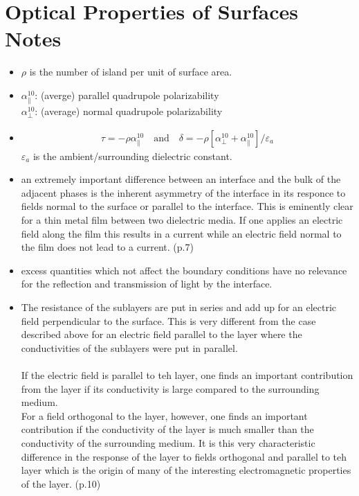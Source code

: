 \section{\textbf{Optical Properties of Surfaces Notes}}
\begin{itemize}
\item $\rho$ is the number of island per unit of surface area.
\item $\alpha_{\parallel}^{10}$: (averge) parallel quadrupole polarizability \\
   $\alpha_{\perp}^{10}$: (average) normal quadrupole polarizability
   \item 
   \begin{align}
      \tau = -\rho \alpha_{\parallel}^{10} \:\:\:\text{ and }\:\:\: \delta = -\rho [\alpha_{\perp}^{10} + \alpha_{\parallel}^{10} ]/\varepsilon_a
   \end{align}
   $\varepsilon_a$ is the ambient/surrounding dielectric constant.

   \item an extremely important difference between an interface and the bulk of the adjacent phases is the
   inherent asymmetry of the interface in its responce to fields normal to the surface or parallel
   to the interface. This is eminently clear for a thin metal film between two dielectric media.
   If one applies an electric field along the film this results in a current while 
   an electric field normal to the film does not lead to a current. (p.7)

   \item excess quantities which not affect the boundary conditions have no relevance for the reflection
   and transmission of light by the interface.

   \item The resistance of the sublayers are put in series and add up for an electric field perpendicular
   to the surface. This is very different from the case described above for an electric field parallel
   to the layer where the conductivities of the sublayers were put in parallel. 
   \\
   \\
   If the electric field is parallel to teh layer, one finds an important contribution from the layer if its 
   conductivity is large compared to the surrounding medium. \\
   For a field orthogonal to the layer, however, one finds an important contribution if the conductivity
   of the layer is much smaller than the conductivity of the surrounding medium. It is this very characteristic
   difference in the response of the layer to fields orthogonal and parallel to teh layer which is the
   origin of many of the interesting electromagnetic properties of the layer. (p.10)


\end{itemize}
